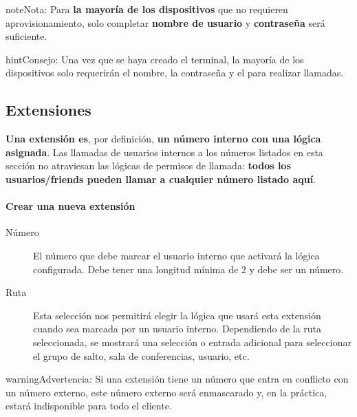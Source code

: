 \documentclass[letterpaper,10pt,spanish]{sphinxmanual}
\begin{document}
\begin{notice}{note}{Nota:}
Para \textbf{la mayoría de los dispositivos} que no requieren aprovisionamiento, solo completar \textbf{nombre de usuario} y \textbf{contraseña} será suficiente.
\end{notice}

\begin{notice}{hint}{Consejo:}
Una vez que se haya creado el terminal, la mayoría de los dispositivos solo requerirán el nombre, la contraseña y el {\hyperref[getting_started/internal_calls/brand_portal:domain\string-per\string-client]{}} para realizar llamadas.
\end{notice}


\subsection{Extensiones}
\label{administration_portal/client/vpbx/extensions:extensions}\label{administration_portal/client/vpbx/extensions::doc}\label{administration_portal/client/vpbx/extensions:id1}
\textbf{Una extensión es}, por definición, \textbf{un número interno con una lógica asignada}. Las llamadas de usuarios internos a los números listados en esta sección no atraviesan las lógicas de permisos de llamada: \textbf{todos los usuarios/friends pueden llamar a cualquier número listado aquí}.
\paragraph{Crear una nueva extensión}
\begin{description}
\item[{Número}] \leavevmode
El número que debe marcar el usuario interno que activará la lógica configurada. Debe tener una longitud mínima de 2 y debe ser un número.

\item[{Ruta}] \leavevmode
Esta selección nos permitirá elegir la lógica que usará esta extensión cuando sea marcada por un usuario interno. Dependiendo de la ruta seleccionada, se mostrará una selección o entrada adicional para seleccionar el grupo de salto, sala de conferencias, usuario, etc.

\end{description}

\begin{notice}{warning}{Advertencia:}
Si una extensión tiene un número que entra en conflicto con un número externo, este número externo será enmascarado y, en la práctica, estará indisponible para todo el cliente.
\end{notice}
\end{document}
